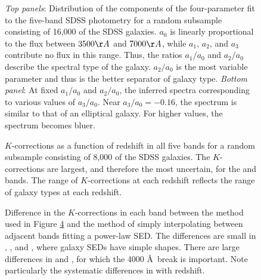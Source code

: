 \clearpage
{}
\begin{figure}
\figurenum{\fignum}
\caption{\label{k_coeffdist_plot} {\it Top panels}: Distribution of
the components of the four-parameter fit to the five-band SDSS
photometry for a random subsample consisting of 16,000 of the SDSS
galaxies. $a_0$ is linearly proportional to the flux between $3500\AA$
and $7000\AA$, while $a_1$, $a_2$, and $a_3$ contribute no flux in
this range. Thus, the ratios $a_1/a_0$ and $a_2/a_0$ describe the
spectral type of the galaxy. $a_2/a_0$ is the most variable parameter
and thus is the better separator of galaxy type. {\it Bottom panel}:
At fixed $a_1/a_0$ and $a_2/a_0$, the inferred spectra corresponding
to various values of $a_3/a_0$. Near $a_3/a_0=-0.16$, the spectrum is
similar to that of an elliptical galaxy. For higher values, the
spectrum becomes bluer. }
\end{figure}

\clearpage
{}
\begin{figure}
\figurenum{\fignum}
\caption{\label{k_coeff_plot1} }
\end{figure}

\clearpage
{}
\begin{figure}
\figurenum{\fignum}
\caption{\label{k_coeff_plot1} }
\end{figure}

\clearpage
{}
\begin{figure}
\figurenum{\fignum}
\caption{\label{kcorrect.sample8b15} $K$-corrections as a function of
redshift in all five bands for a random subsample consisting of 8,000
of the SDSS galaxies. The $K$-corrections are largest, and therefore
the most uncertain, for the  and  bands. The
range of $K$-corrections at each redshift reflects the range of galaxy
types at each redshift.}
\end{figure}

\clearpage
{}
\begin{figure}
\figurenum{\fignum}
\caption{\label{ciCompare.sample8b15} Difference in the
$K$-corrections in each band between the method used in Figure
\ref{kcorrect.sample8b15} and the method of simply interpolating
between adjacent bands fitting a power-law SED. The differences are
small in , , and , where galaxy
SEDs have simple shapes. There are large differences in 
and , for which the 4000 \AA\ break is important. Note
particularly the systematic differences in  with
redshift.}
\end{figure}

